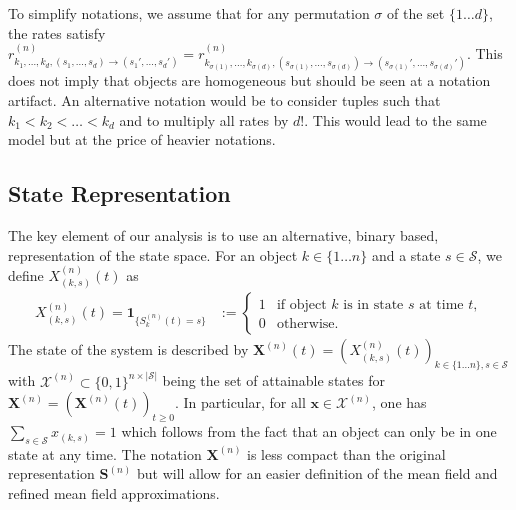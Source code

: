 \documentclass[acmsmall]{acmart}
\newcommand\bx{\mathbf{x}}
\newcommand\bS{\mathbf{S}}
\newcommand\bX{\mathbf{X}}
\newcommand\calX{\mathcal{X}}
\newcommand\calS{\mathcal{S}}
\newcommand\toN{^{(n)}}
\newcommand\bSn{\bS\toN}
\newcommand\bXn{\bX\toN}
\newcommand\Xn{X\toN}
\newcommand\ns{n\times|\calS|} %
\newcommand\ind[1]{\mathbf{1}_{\{#1\}}} %
\begin{document}
To simplify notations, we assume that for any permutation $\sigma$ of the set $\{1\dots d\}$, the rates satisfy $r_{k_1, \dots, k_{d}, (s_1, \dots, s_{d}) \rightarrow (s_1', \dots, s_{d}')}\toN = r_{k_{\sigma(1)}, \dots, k_{\sigma(d)}, (s_{\sigma(1)}, \dots, s_{\sigma(d)}) \rightarrow (s_{\sigma(1)}', \dots, s_{\sigma(d)}')}\toN$. This does not imply that objects are homogeneous but should be seen at a notation artifact. An alternative notation would be to consider tuples such that $k_1<k_2<\dots <k_d$ and to multiply all rates by $d!$. This would lead to the same model but at the price of heavier notations.


\subsection{State Representation}
\label{ssec:state_representation}
The key element of our analysis is to use an alternative, binary based, representation of the state space. For an object $k\in\{1\hdots n\}$ and a state $s\in\calS$, we define $\Xn_{(k,s)}(t)$ as
\begin{align*}
  \Xn_{(k,s)}(t) = \ind{S_k\toN(t)=s} &:=\left\{\begin{array}{ll}
    1 &\text{if object $k$ is in state $s$ at time $t$}, \\
    0 &\text{otherwise.}
  \end{array}\right.
\end{align*}
The state of the system is described by $\bXn(t)=(\Xn_{(k,s)}(t))_{k\in\{1\hdots n\},s\in\calS}$ with $\calX\toN\subset\{0,1\}^{\ns}$ being the set of attainable states for $\bXn=(\bXn(t))_{t\geq0}$. In particular, for all $\bx\in\calX\toN$, one has $\sum_{s\in\calS} x_{(k,s)} = 1$ which follows from the fact that an object can only be in one state at any time. The notation $\bXn$ is less compact than the original representation $\bSn$ but will allow for an easier definition of the mean field and refined mean field approximations. 
\end{document}
